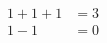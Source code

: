 \documentclass{article}
\begin{document}
\begin{align}
  1 + 1 + 1 &=3 \\
  1 - 1 &= 0
\end{align}
\end{document}
